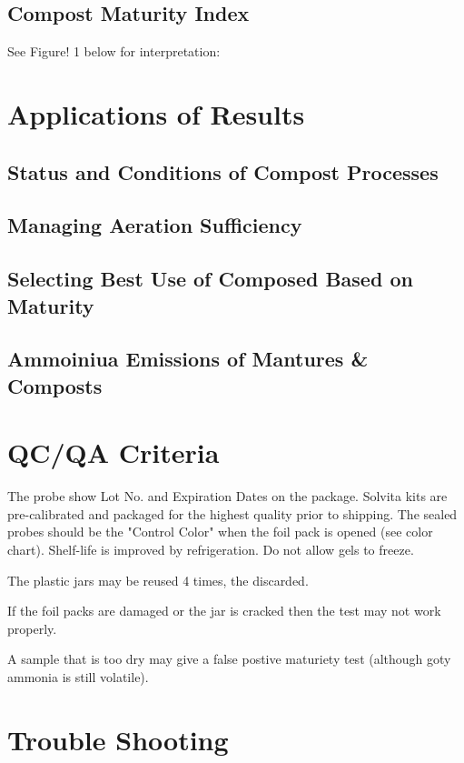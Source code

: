\documentclass[12pt]{../SOP4_alpha}\usepackage[]{graphicx}\usepackage[]{xcolor}
\begin{document}
\subsection{Compost Maturity Index}

\NP See Figure! 1 below for interpretation:

\section{Applications of Results}

\subsection{Status and Conditions of Compost Processes}

\subsection{Managing Aeration Sufficiency}

\subsection{Selecting Best Use of Composed Based on Maturity}


\subsection{Ammoiniua Emissions of Mantures \& Composts}

\section{QC/QA Criteria}

\NP The probe show Lot No. and Expiration Dates on the package. Solvita kits are pre-calibrated and packaged for the highest quality prior to shipping. The sealed probes should be the "Control Color" when the foil pack is opened (see color chart).  Shelf-life is improved by refrigeration. Do not allow gels to freeze. 

\NP The plastic jars may be reused 4 times, the discarded. 

\NP If the foil packs are damaged or the jar is cracked then the test may not work properly.

\NP A sample that is too dry may give a false postive maturiety test (although goty ammonia is still volatile).

\section{Trouble Shooting}
\end{document}
